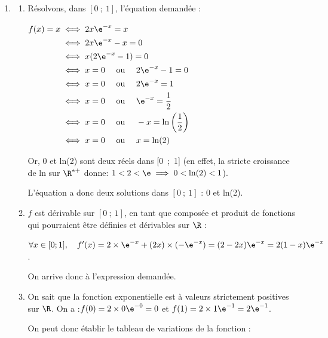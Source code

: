
\medskip

	\begin{enumerate}
		\item \begin{enumerate}
	\item Résolvons, dans $[0~;~1]$, l'équation demandée :

$ \aligned[t]  f(x) = x &\iff 2x \e^{-x} = x\\
&\iff 2x \e^{-x} - x = 0\\
&\iff x(2\e^{-x}-1) = 0\\
&\iff x = 0 \quad \text{ ou } \quad 2\e^{-x} - 1 = 0\\
&\iff x = 0 \quad \text{ ou } \quad 2\e^{-x} = 1\\
&\iff x = 0 \quad \text{ ou } \quad \e^{-x} = \dfrac{1}{2}\\
&\iff x = 0 \quad \text{ ou } \quad -x = \ln\left(\dfrac{1}{2}\right) \\
&\iff x = 0 \quad \text{ ou } \quad x = \ln(2)
\endaligned$

Or, 0 et ln(2) sont deux réels dans [0~;~1] (en effet, la stricte croissance de ln sur $\R^{*+}$ donne: \quad $1 < 2 < \e \implies 0 < \ln(2) < 1$).

L'équation a donc deux solutions dans $ [0~;~1] $ : 0 et ln(2).

	\item $f$ est dérivable sur $ [0~;~1] $, en tant que composée et produit de fonctions qui pourraient être définies et dérivables sur $\R$ :

$\forall x \in [0 ; 1],\quad f'(x) = 2 \times \e^{-x} + (2x) \times (-\e^{-x})
 = (2 - 2x)\e^{-x} = 2(1 -x)\e^{-x}$.

On arrive donc à l'expression demandée.

		\item On sait que la fonction exponentielle est à valeurs strictement positives sur $\R$. On a :\quad $f(0) = 2\times 0 \e^{-0} = 0$ \quad et \quad $f(1) = 2\times 1\e^{-1} = 2\e^{-1}$.

On peut donc établir le tableau de variations de la fonction :

\begin{center}
			\end{center}
		\end{enumerate}


\end{enumerate}
